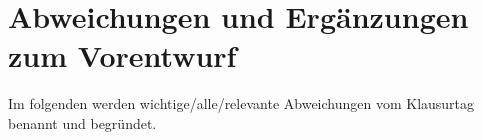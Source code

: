 \chapter{Abweichungen und Ergänzungen zum Vorentwurf}
\label{Abweichungen}
Im folgenden werden wichtige/alle/relevante Abweichungen vom Klausurtag benannt und begründet.
